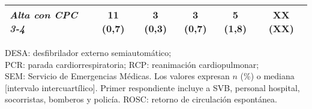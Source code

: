 \begin{table}[ht]
{\begin{tabular}{l c c c c c}
\textit{Alta con CPC 3-4}                      & 11 (0,7)      & 3 (0,3)    & 3 (0,7)    & 5 (1,8)    & XX (XX) \\ \hline
\end{tabular}
}
\begin{flushleft}
\footnotesize
DESA: desfibrilador externo semiautomático; \\
PCR: parada cardiorrespiratoria; RCP: reanimación cardiopulmonar; \\ 
SEM: Servicio de Emergencias Médicas. Los valores expresan $n$ (\%) o mediana [intervalo intercuartílico].
Primer respondiente incluye a SVB, personal hospital, socorristas, bomberos y policía.
ROSC: retorno de circulación espontánea.
\end{flushleft}
\label{tab:descriptive_statistics}
\end{table}